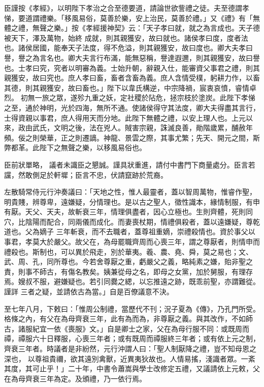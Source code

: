 \begin{pinyinscope}
 臣謹按《孝經》，以明陛下孝治之合至德要道，請論世欲訾禮之徒。夫至德謂孝悌，要道謂禮樂。「移風易俗，莫善於樂，安上治民，莫善於禮。」又《禮》有「無體之禮，無聲之樂。」按《孝經援神契》云：「天子孝曰就，就之為言成也。天子德被天下，澤及萬物，始終
 成就，則其親獲安，故曰就也。諸侯孝曰度，度者法也。諸侯居國，能奉天子法度，得不危溢，則其親獲安，故曰度也。卿大夫孝曰譽，譽之為言名也。卿大夫言行布滿，能無惡稱，譽達遐邇，則其親獲安，故曰譽也。士孝曰究，究者以明審為義。士始升朝，辭親入仕，能審資父事君之禮，則其親獲安，故曰究也。庶人孝曰畜，畜者含畜為義。庶人含情受樸，躬耕力作，以畜其德，則其親獲安，故曰畜也。」陛下以韋氏構逆，中宗降禍，宸衷哀憤，睿情卓烈。
 初無一旅之眾，遂殄九重之妖，定社稷於阽危，拯宗枝於塗炭。此陛下孝悌之至，通於神明，光於四海，無所不通。使諸侯得守其法度，卿大夫得盡其言行，士得資親以事君，庶人得用天而分地。此陛下無體之禮，以安上理人也。上元以來，政由武氏，文明之後，法在兇人。賊害宗親，誅滅良善，勛階歲累，酺赦年頻。佞之則榮華，正之則遷謫。神龍、景雲之際，其事尤繁；先天、開元之間，斯弊都革。此陛下之無聲之樂，以移風易俗也。



 臣前狀單略，
 議者未識臣之懇誠。謹具狀重進，請付中書門下商量處分。臣言若讜，然敢側足於軒墀；臣言不忠，伏請竄跡於荒裔。



 左散騎常侍元行沖奏議曰：「天地之性，惟人最靈者，蓋以智周萬物，惟睿作聖，明貴賤，辨尊卑，遠嫌疑，分情理也。是以古之聖人，徵性識本，緣情制服，有申有厭。天父、天夫，故斬衰三年，情理俱盡者，因心立極也。生則齊體，死則同穴，比陰陽而配合，同兩儀而成化。而妻喪杖期，情禮俱殺者，蓋以遠嫌疑，尊乾道也。父為嫡子
 三年斬衰，而不去職者，蓋尊祖重嫡，崇禮殺情也。資於事父以事君，孝莫大於嚴父。故父在，為母罷職齊周而心喪三年，謂之尊厭者，則情申而禮殺也。斯制也，可以異於飛走，別於華夷。羲、農、堯、舜，莫之易也；文、武、周、孔，同所尊也。今若舍尊厭之重，虧嚴父之義，略純素之嫌，貽非聖之責，則事不師古，有傷名教矣。姨兼從母之名，即母之女黨，加於舅服，有理存焉。嫂叔不服，避嫌疑也。若引同爨之緦，以忘推遠之跡，既乖前聖，亦謂難從。謹詳
 三者之疑，並請依古為當。」自是百僚議意不決。



 至七年八月，下敕曰：「惟周公制禮，當歷代不刊；況子夏為《傳》，乃孔門所受。格條之內，有父在為母齊衰三年，此有為而為，非尊厭之義。與其改作，不如師古，諸服紀宜一依《喪服》文。」自是卿士之家，父在為母行服不同：或既周而禫，禫服六十日釋服，心喪三年者；或有既周而禫服終三年者；或有依上元之制，齊衰三年者。時議者是非紛然，元行沖謂人曰：「聖人制厭降之禮，豈不知母恩之深也，
 以尊祖貴禰，欲其遠別禽獸，近異夷狄故也。人情易搖，淺識者眾。一紊其度，其可止乎！」二十年，中書令蕭嵩與學士改修定五禮，又議請依上元敕，父在為母齊衰三年為定。及頒禮，乃一依行焉。




\end{pinyinscope}
